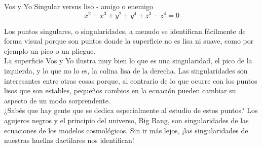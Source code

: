 \begin{surferPage}{Vos y Yo}
Singular versus liso - amigo o enemigo\\
\smallskip
\[x^2	- x^3+ y^2+ y^4+ z^3- z^4	=  0\]

\vspace{0.3cm}
Los puntos singulares, o singularidades, a menudo se identifican f\'acilmente de forma visual porque son puntos donde la superficie no es lisa ni suave, como por ejemplo un pico o un pliegue.\\
\vspace{0.3cm}
La superficie Vos y Yo ilustra muy bien lo que es una singularidad, el pico de la izquierda, y lo que no lo es, la colina lisa de la derecha. Las singularidades son interesantes entre otras cosas porque, al contrario de lo que ocurre con los puntos lisos que son estables, pequeños cambios en la ecuaci\'on pueden cambiar su aspecto de un modo sorprendente.\\
\vspace{0.3cm}
¿Sab\'es que hay gente que se dedica especialmente al estudio de estos puntos? Los agujeros negros y el principio del universo, Big Bang, son singularidades de las ecuaciones de los modelos cosmol\'ogicos. Sin ir m\'as lejos, ¡las singularidades de nuestras huellas dactilares nos identifican!
\end{surferPage}
